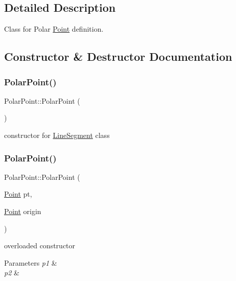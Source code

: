 \subsection{Detailed Description}
Class for Polar \mbox{\hyperlink{class_point}{Point}} definition. 

\subsection{Constructor \& Destructor Documentation}
\mbox{\label{class_polar_point_aa5dc669fa33f48c9dccd235751cb8db5}} 
\subsubsection{\texorpdfstring{PolarPoint()}{PolarPoint()}\hspace{0.1cm}{\footnotesize\ttfamily [1/2]}}
{\footnotesize\ttfamily Polar\+Point\+::\+Polar\+Point (\begin{DoxyParamCaption}{ }\end{DoxyParamCaption})}

constructor for \mbox{\hyperlink{class_line_segment}{Line\+Segment}} class \mbox{\label{class_polar_point_a85656b69c29c9f60781dd734926863b6}} 
\subsubsection{\texorpdfstring{PolarPoint()}{PolarPoint()}\hspace{0.1cm}{\footnotesize\ttfamily [2/2]}}
{\footnotesize\ttfamily Polar\+Point\+::\+Polar\+Point (\begin{DoxyParamCaption}\item[{\mbox{\hyperlink{class_point}{Point}}}]{pt,  }\item[{\mbox{\hyperlink{class_point}{Point}}}]{origin }\end{DoxyParamCaption})}

overloaded constructor 
\begin{DoxyParams}{Parameters}
{\em p1} & \\
\hline
{\em p2} & \\
\hline
\end{DoxyParams}


